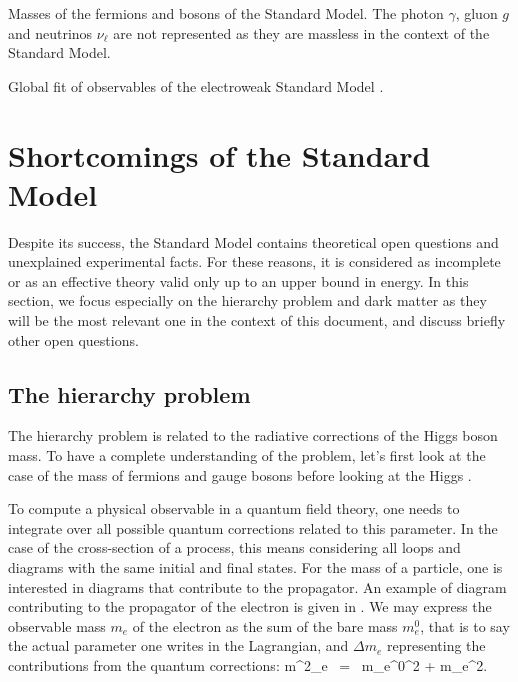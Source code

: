                  {Masses of the fermions and bosons of the Standard Model. The photon
                 $\gamma$, gluon $g$ and neutrinos $\nu_\ell$ are not represented as they
                 are massless in the context of the Standard Model.}

                 {Global fit of observables of the electroweak Standard Model \cite{GFitter}.}

    \section{Shortcomings of the Standard Model \label{sec:standardModelShortcomings}}

    Despite its success, the Standard Model contains theoretical open questions and unexplained
    experimental facts. For these reasons, it is considered as incomplete or as an effective
    theory valid only up to an upper bound in energy.
    In this section, we focus especially on the hierarchy problem and dark matter as they
    will be the most relevant one in the context of this document, and discuss briefly
    other open questions.

        \subsection{The hierarchy problem}

    The hierarchy problem is related to the radiative corrections of the Higgs boson mass.
    To have a complete understanding of the problem, let's first look at the case of the
    mass of fermions and gauge bosons before looking at the Higgs \cite{SupersymmetryDemystified}.

    To compute a physical observable in a quantum field theory, one needs to
    integrate over all possible quantum corrections related to this parameter. In the case
    of the cross-section of a process, this means considering all loops and diagrams
    with the same initial and final states. For the mass of a particle, one is
    interested in diagrams that contribute to the propagator. An example of diagram contributing
    to the propagator of the electron is given in . We may
    express the observable mass $m_e$ of the electron as the sum of the bare mass $m^0_{e}$,
    that is to say the actual parameter one writes in the Lagrangian, and $\Delta m_e$ representing
    the contributions from the quantum corrections:
    {
        m^2_e \, = \, {m_e^0}^2 + \Delta m_e^2.
    }

